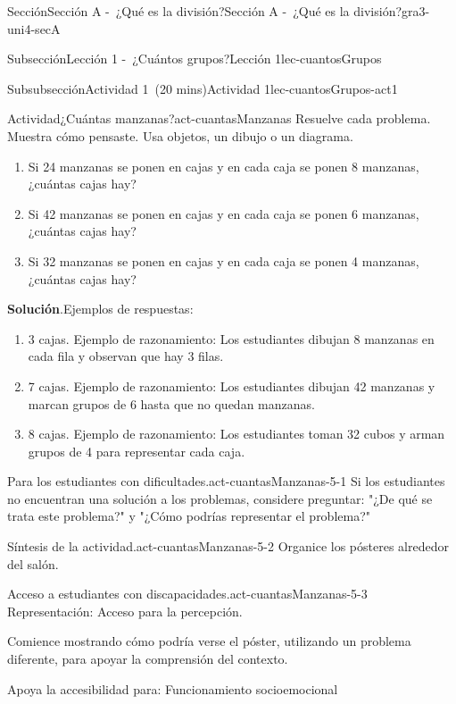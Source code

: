 \documentclass[oneside,10pt,]{article}
\newcommand{\blocktitlefont}{\relax}
\begin{document}
\begin{sectionptx}{Sección}{Sección A -~¿Qué es la división?}{}{Sección A -~¿Qué es la división?}{}{}{gra3-uni4-secA}
\begin{subsectionptx}{Subsección}{Lección 1 -~¿Cuántos grupos?}{}{Lección 1}{}{}{lec-cuantosGrupos}
\begin{subsubsectionptx}{Subsubsección}{Actividad 1~(20 mins)}{}{Actividad 1}{}{}{lec-cuantosGrupos-act1}
\begin{activity}{Actividad}{¿Cuántas manzanas?}{act-cuantasManzanas}%
Resuelve cada problema. Muestra cómo pensaste. Usa objetos, un dibujo o un diagrama.%
\par
%
\begin{enumerate}
\item{}Si 24 manzanas se ponen en cajas y en cada caja se ponen 8 manzanas, ¿cuántas cajas hay?%
\item{}Si 42 manzanas se ponen en cajas y en cada caja se ponen 6 manzanas, ¿cuántas cajas hay?%
\item{}Si 32 manzanas se ponen en cajas y en cada caja se ponen 4 manzanas, ¿cuántas cajas hay?%
\end{enumerate}
%
\par\smallskip%
\noindent\textbf{\blocktitlefont Solución}.\hypertarget{act-cuantasManzanas-3}{}\quad{}Ejemplos de respuestas:%
%
\begin{enumerate}
\item{}3 cajas. Ejemplo de razonamiento: Los estudiantes dibujan 8 manzanas en cada fila y observan que hay 3 filas.%
\item{}7 cajas. Ejemplo de razonamiento: Los estudiantes dibujan 42 manzanas y marcan grupos de 6 hasta que no quedan manzanas.%
\item{}8 cajas. Ejemplo de razonamiento: Los estudiantes toman 32 cubos y arman grupos de 4 para representar cada caja.%
\end{enumerate}
\end{activity}%
\par
\begin{paragraphs}{Para los estudiantes con dificultades.}{act-cuantasManzanas-5-1}%
Si los estudiantes no encuentran una solución a los problemas, considere preguntar: "¿De qué se trata este problema?" y "¿Cómo podrías representar el problema?"%
\end{paragraphs}%
\begin{paragraphs}{Síntesis de la actividad.}{act-cuantasManzanas-5-2}%
Organice los pósteres alrededor del salón.%
\end{paragraphs}%
\begin{paragraphs}{Acceso a estudiantes con discapacidades.}{act-cuantasManzanas-5-3}%
Representación: Acceso para la percepción.%
\par
Comience mostrando cómo podría verse el póster, utilizando un problema diferente, para apoyar la comprensión del contexto.%
\par
Apoya la accesibilidad para: Funcionamiento socioemocional%

\end{paragraphs}
\end{subsubsectionptx}
\end{subsectionptx}
\end{sectionptx}
\end{document}
